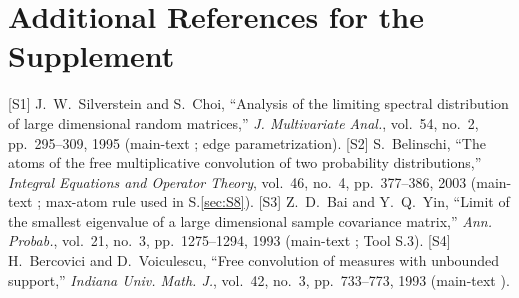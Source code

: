 \section{Additional References for the Supplement}\label{sec:S22}

[S1] J.~W.~Silverstein and S.~Choi, ``Analysis of the limiting spectral distribution of large dimensional random matrices,'' \emph{J. Multivariate Anal.}, vol.~54, no.~2, pp.~295--309, 1995 (main-text \cite{silverstein1995analysis}; edge parametrization).
[S2] S.~Belinschi, ``The atoms of the free multiplicative convolution of two probability distributions,'' \emph{Integral Equations and Operator Theory}, vol.~46, no.~4, pp.~377--386, 2003 (main-text \cite{belinschi-atoms}; max-atom rule used in S.\ref{sec:S8}).
[S3] Z.~D.~Bai and Y.~Q.~Yin, ``Limit of the smallest eigenvalue of a large dimensional sample covariance matrix,'' \emph{Ann. Probab.}, vol.~21, no.~3, pp.~1275--1294, 1993 (main-text \cite{bai1993limit}; Tool S.3).
[S4] H.~Bercovici and D.~Voiculescu, ``Free convolution of measures with unbounded support,'' \emph{Indiana Univ. Math. J.}, vol.~42, no.~3, pp.~733--773, 1993 (main-text \cite{bercovici1993free}).
